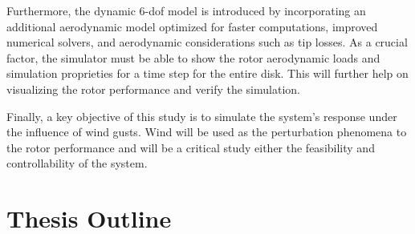 Furthermore, the dynamic 6-\gls{dof} model is introduced by incorporating an additional aerodynamic model optimized for faster computations, improved numerical solvers, and aerodynamic considerations such as tip losses. As a crucial factor, the simulator must be able to show the rotor aerodynamic loads and simulation proprieties for a time step for the entire disk. This will further help on visualizing the rotor performance and verify the simulation.

Finally, a key objective of this study is to simulate the system's response under the influence of wind gusts. Wind will be used as the perturbation phenomena to the rotor performance and will be a critical study either the feasibility and controllability of the system.

\section{Thesis Outline}
\label{section:outline}
